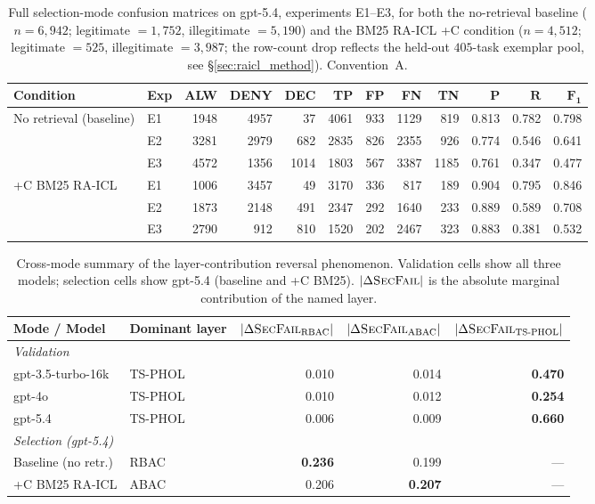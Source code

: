 \documentclass[10pt,a4paper,twocolumn]{article}
\begin{document}
\begin{table}[H]
\centering
\caption{Full selection-mode confusion matrices on gpt-5.4, experiments E1--E3, for both the no-retrieval baseline ($n=6{,}942$; legitimate $=1{,}752$, illegitimate $=5{,}190$) and the BM25 RA-ICL +C condition ($n=4{,}512$; legitimate $=525$, illegitimate $=3{,}987$; the row-count drop reflects the held-out $405$-task exemplar pool, see \S\ref{sec:raicl_method}). Convention~A.}
\label{tab:selection_full}
\scriptsize
\setlength{\tabcolsep}{2.4pt}
\begin{tabular}{@{}llrrrrrrrrrr@{}}
\toprule
\textbf{Condition} & \textbf{Exp} & \textbf{ALW} & \textbf{DENY} & \textbf{DEC} & \textbf{TP} & \textbf{FP} & \textbf{FN} & \textbf{TN} & $\mathbf{P}$ & $\mathbf{R}$ & $\mathbf{F_1}$ \\
\midrule
\multirow{3}{*}{No retrieval (baseline)}
 & E1 & 1948 & 4957 &   37 & 4061 &  933 & 1129 &  819 & 0.813 & 0.782 & 0.798 \\
 & E2 & 3281 & 2979 &  682 & 2835 &  826 & 2355 &  926 & 0.774 & 0.546 & 0.641 \\
 & E3 & 4572 & 1356 & 1014 & 1803 &  567 & 3387 & 1185 & 0.761 & 0.347 & 0.477 \\
\midrule
\multirow{3}{*}{+C BM25 RA-ICL}
 & E1 & 1006 & 3457 &   49 & 3170 &  336 &  817 &  189 & 0.904 & 0.795 & 0.846 \\
 & E2 & 1873 & 2148 &  491 & 2347 &  292 & 1640 &  233 & 0.889 & 0.589 & 0.708 \\
 & E3 & 2790 &  912 &  810 & 1520 &  202 & 2467 &  323 & 0.883 & 0.381 & 0.532 \\
\bottomrule
\end{tabular}
\end{table}

\begin{table}[H]
\centering
\caption{Cross-mode summary of the layer-contribution reversal phenomenon. Validation cells show all three models; selection cells show gpt-5.4 (baseline and +C BM25). $|\Delta\textsc{SecFail}|$ is the absolute marginal contribution of the named layer.}
\label{tab:cross_mode_summary}
\small
\setlength{\tabcolsep}{4pt}
\begin{tabular}{@{}llrrr@{}}
\toprule
\textbf{Mode / Model} & \textbf{Dominant layer} & $|\Delta\textsc{SecFail}_{\textrm{RBAC}}|$ & $|\Delta\textsc{SecFail}_{\textrm{ABAC}}|$ & $|\Delta\textsc{SecFail}_{\textrm{TS-PHOL}}|$ \\
\midrule
\multicolumn{5}{l}{\textit{Validation}} \\
gpt-3.5-turbo-16k & TS-PHOL & 0.010 & 0.014 & \textbf{0.470} \\
gpt-4o            & TS-PHOL & 0.010 & 0.012 & \textbf{0.254} \\
gpt-5.4           & TS-PHOL & 0.006 & 0.009 & \textbf{0.660} \\
\midrule
\multicolumn{5}{l}{\textit{Selection (gpt-5.4)}} \\
Baseline (no retr.) & RBAC & \textbf{0.236} & 0.199 & --- \\
+C BM25 RA-ICL      & ABAC & 0.206 & \textbf{0.207} & --- \\
\bottomrule
\end{tabular}
\end{table}
\end{document}
